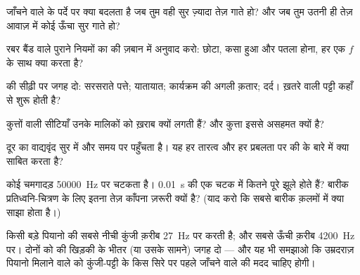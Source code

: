 \begin{exercise}[$\star$]\label{exo:g8:sound-pitch-loudness:4}
जाँचने वाले के पर्दे पर क्या बदलता है जब तुम वही सुर ज़्यादा तेज़
गाते हो? और जब तुम उतनी ही तेज़ आवाज़ में कोई ऊँचा सुर गाते हो?
\end{exercise}

\begin{exercise}[$\star$]\label{exo:g8:sound-pitch-loudness:5}
रबर बैंड वाले पुराने नियमों का  की ज़बान में अनुवाद करो: छोटा,
कसा हुआ और पतला होना, हर एक $f$ के साथ क्या करता है?
\end{exercise}

\begin{exercise}[$\star$]\label{exo:g8:sound-pitch-loudness:6}
 की सीढ़ी पर जगह दो: सरसराते पत्ते; यातायात; कार्यक्रम की अगली
क़तार; दर्द। ख़तरे वाली पट्टी कहाँ से शुरू होती है?
\end{exercise}

\begin{exercise}[$\star$]\label{exo:g8:sound-pitch-loudness:7}
कुत्तों वाली सीटियाँ उनके मालिकों को ख़राब क्यों लगती हैं? और कुत्ता
इससे असहमत क्यों है?
\end{exercise}

\begin{exercise}[$\star$]\label{exo:g8:sound-pitch-loudness:8}
दूर का वाद्यवृंद सुर में और समय पर पहुँचता है। यह हर तारत्व और हर
प्रबलता पर  की  के बारे में क्या साबित करता है?
\end{exercise}

\begin{exercise}[$\star\star$]\label{exo:g8:sound-pitch-loudness:9}
कोई चमगादड़ \qty{50000}{Hz} पर चटकता है। \qty{0.01}{s} की एक चटक में
कितने पूरे झूले होते हैं? बारीक प्रतिध्वनि-चित्रण के लिए इतना तेज़
काँपना ज़रूरी क्यों है? (याद करो कि सबसे बारीक क़लमों में क्या साझा
होता है।)
\end{exercise}

\begin{exercise}[$\star\star$]\label{exo:g8:sound-pitch-loudness:10}
किसी बड़े पियानो की सबसे नीची कुंजी क़रीब \qty{27}{Hz} पर  करती
है; और सबसे ऊँची क़रीब \qty{4200}{Hz} पर। दोनों को  की खिड़की के
भीतर (या उसके सामने) जगह दो --- और यह भी समझाओ कि उम्रदराज़ पियानो
मिलाने वाले को कुंजी-पट्टी के किस सिरे पर पहले जाँचने वाले की मदद
चाहिए होगी।
\end{exercise}

